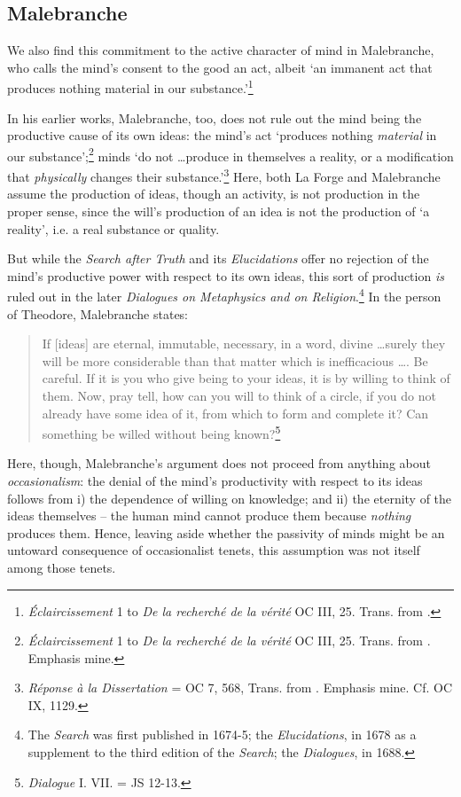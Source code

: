 \subsection{Malebranche}
We also find this commitment to the active character of mind in Malebranche, who calls the mind's consent to the good an act, albeit `an immanent act that produces nothing material in our substance.'\footnote{\emph{Éclaircissement} 1 to \emph{De la recherché de la vérité} OC III, 25. Trans. from \autocite[52]{Nadler2005}.}

In his earlier works, Malebranche, too, does not rule out the mind being the productive cause of its own ideas: the mind's act `produces nothing \emph{material} in our substance';\footnote{\emph{Éclaircissement} 1 to \emph{De la recherché de la vérité} OC III, 25. Trans. from \autocite[52]{Nadler2005}. Emphasis mine.} minds `do not \ldots produce in themselves a reality, or a modification that \emph{physically} changes their substance.'\footnote{\emph{Réponse à la Dissertation} = OC 7, 568, Trans. from \autocite[52]{Nadler2005}. Emphasis mine. Cf. OC IX, 1129.} Here, both La Forge and Malebranche assume the production of ideas, though an activity, is not production in the proper sense, since the will's production of an idea is not the production of `a reality', i.e. a real substance or quality.

But while the \emph{Search after Truth} and its \emph{Elucidations} offer no rejection of the mind's productive power with respect to its own ideas, this sort of production \emph{is} ruled out in the later \emph{Dialogues on Metaphysics and on Religion}.\footnote{The \emph{Search} was first published in 1674-5; the \emph{Elucidations}, in 1678 as a supplement to the third edition of the \emph{Search}; the \emph{Dialogues}, in 1688.} In the person of Theodore, Malebranche states:

\begin{quote}
	If [ideas] are eternal, immutable, necessary, in a word, divine \ldots surely they will be more considerable than that matter which is inefficacious \ldots. Be careful. If it is you who give being to your ideas, it is by willing to think of them. Now, pray tell, how can you will to think of a circle, if you do not already have some idea of it, from which to form and complete it? Can something be willed without being known?\footnote{\emph{Dialogue} I. VII. = JS 12-13.}
\end{quote}

Here, though, Malebranche's argument does not proceed from anything about \emph{occasionalism}: the denial of the mind's productivity with respect to its ideas follows from i) the dependence of willing on knowledge; and ii) the eternity of the ideas themselves -- the human mind cannot produce them because \emph{nothing} produces them. Hence, leaving aside whether the passivity of minds might be an untoward consequence of occasionalist tenets, this assumption was not itself among those tenets.

